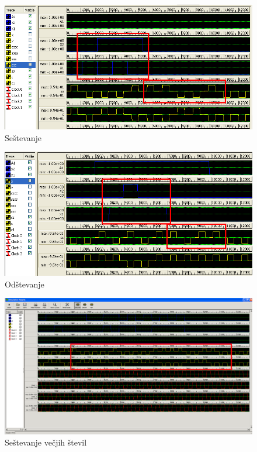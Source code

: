 \documentclass[seminar, slovene]{FRIreport}
\begin{document}
\begin{minipage}[H]{16cm}
\begin{figure}[H]
\includegraphics[width=14cm]{qca/img/sestevalnikTrace}
\caption{Seštevanje}
\end{figure}
\begin{figure}[H]
\includegraphics[width=14cm]{qca/img/odstevalnikTrace}
\caption{Odštevanje}
\end{figure}
\end{minipage}
\begin{figure}[H]
\includegraphics[width=14cm]{simulacije/long}
\caption{Seštevanje večjih števil}
\label{sestevalnik}
\end{figure}
\end{document}
